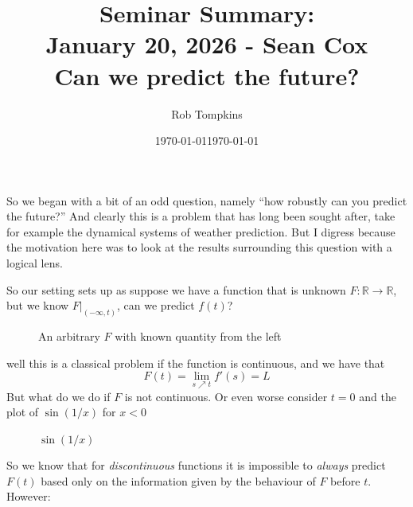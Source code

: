\documentclass[12pt]{amsart}
\title{Seminar Summary:\\January 20, 2026 - Sean Cox\\Can we predict the future?}
\author{Rob Tompkins}
\date{\today}
\begin{document}
    \maketitle
    \date{\today}
    \begin{onehalfspace}
        So we began with a bit of an odd question, namely ``how robustly can you predict the future?'' And clearly
        this is a problem that has long been sought after, take for example the dynamical systems of weather prediction.
        But I digress because the motivation here was to look at the results surrounding this question with a logical
        lens.

        So our setting sets up as suppose we have a function that is unknown $F:\mathbb{R} \rightarrow \mathbb{R}$, but
        we know $F|_{(-\infty,t)}$, can we predict $f(t)$?
        \begin{figure}[!ht]
            \centering
            \caption{An arbitrary $F$ with known quantity from the left}
        \end{figure}

        well this is a classical problem if the function is continuous, and we have that
        \begin{displaymath}
            F(t) = \lim_{s\nearrow t} f'(s) = L
        \end{displaymath}
        But what do we do if $F$ is not continuous. Or even worse consider $t=0$ and the plot of $\sin(1/x)$ for $x<0$

        \begin{figure}[!ht]
            \centering
            \caption{$\sin(1/x)$}
        \end{figure}
        So we know that for \emph{discontinuous} functions it is impossible to \emph{always} predict$F(t)$ based only
        on the information given by the behaviour of $F$ before $t$. However:



\end{onehalfspace}
\end{document}
